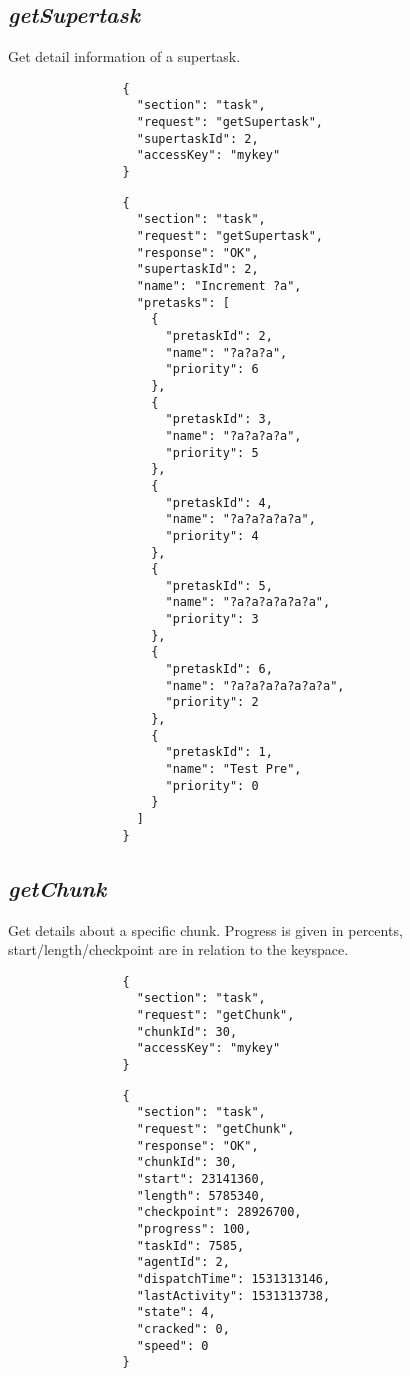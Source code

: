 \documentclass{article}
\begin{document}
		\subsection*{\textit{getSupertask}}
			Get detail information of a supertask.
			{
				\color{blue}
				\begin{verbatim}
				{
				  "section": "task",
				  "request": "getSupertask",
				  "supertaskId": 2,
				  "accessKey": "mykey"
				}
				\end{verbatim}
			}
			{
				\color{OliveGreen}
				\begin{verbatim}
				{
				  "section": "task",
				  "request": "getSupertask",
				  "response": "OK",
				  "supertaskId": 2,
				  "name": "Increment ?a",
				  "pretasks": [
				    {
				      "pretaskId": 2,
				      "name": "?a?a?a",
				      "priority": 6
				    },
				    {
				      "pretaskId": 3,
				      "name": "?a?a?a?a",
				      "priority": 5
				    },
				    {
				      "pretaskId": 4,
				      "name": "?a?a?a?a?a",
				      "priority": 4
				    },
				    {
				      "pretaskId": 5,
				      "name": "?a?a?a?a?a?a",
				      "priority": 3
				    },
				    {
				      "pretaskId": 6,
				      "name": "?a?a?a?a?a?a?a",
				      "priority": 2
				    },
				    {
				      "pretaskId": 1,
				      "name": "Test Pre",
				      "priority": 0
				    }
				  ]
				}
				\end{verbatim}
			}
		\subsection*{\textit{getChunk}}
			Get details about a specific chunk. Progress is given in percents, start/length/checkpoint are in relation to the keyspace.
			{
				\color{blue}
				\begin{verbatim}
				{
				  "section": "task",
				  "request": "getChunk",
				  "chunkId": 30,
				  "accessKey": "mykey"
				}
				\end{verbatim}
			}
			{
				\color{OliveGreen}
				\begin{verbatim}
				{
				  "section": "task",
				  "request": "getChunk",
				  "response": "OK",
				  "chunkId": 30,
				  "start": 23141360,
				  "length": 5785340,
				  "checkpoint": 28926700,
				  "progress": 100,
				  "taskId": 7585,
				  "agentId": 2,
				  "dispatchTime": 1531313146,
				  "lastActivity": 1531313738,
				  "state": 4,
				  "cracked": 0,
				  "speed": 0
				}
				\end{verbatim}
			}
		
\end{document}

